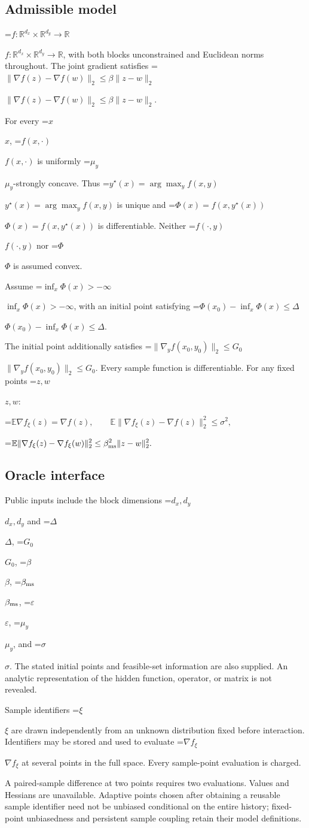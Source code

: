 \documentclass[10pt,a4paper]{article}
\newcommand{\AtlasMath}[1]{\par\begingroup\centering\setbox0=\hbox{$\displaystyle #1$}\ifdim\wd0>1.4\linewidth\typeout{ATLAS WIDE FORMULA: \the\wd0}\fi\ifdim\wd0>\linewidth\resizebox{\linewidth}{!}{\box0}\else\box0\fi\par\endgroup}
\newcommand{\AtlasInlineMath}[1]{\begingroup\setbox0=\hbox{$#1$}\ifdim\wd0>.4\linewidth\endgroup\AtlasMath{#1}\else\endgroup$#1$\fi}
\begin{document}
\subsection{Admissible model}
\AtlasInlineMath{f:\mathbb{R}^{d_x}\times\mathbb{R}^{d_y}\to\mathbb{R}}, with both blocks unconstrained and Euclidean norms throughout. The joint gradient satisfies \AtlasInlineMath{\|\nabla f(z)-\nabla f(w)\|_2\le \beta\|z-w\|_2}.

For every \AtlasInlineMath{x}, \AtlasInlineMath{f(x,\cdot)} is uniformly \AtlasInlineMath{\mu_y}-strongly concave. Thus \AtlasInlineMath{y^\star(x)=\arg\max_y f(x,y)} is unique and \AtlasInlineMath{\Phi(x)=f(x,y^\star(x))} is differentiable. Neither \AtlasInlineMath{f(\cdot,y)} nor \AtlasInlineMath{\Phi} is assumed convex.

Assume \AtlasInlineMath{\inf_x\Phi(x)>-\infty}, with an initial point satisfying \AtlasInlineMath{\Phi(x_0)-\inf_x\Phi(x)\le\Delta}.

The initial point additionally satisfies \AtlasInlineMath{\|\nabla_yf(x_0,y_0)\|_2\le G_0}. Every sample function is differentiable. For any fixed points \AtlasInlineMath{z,w}:


\AtlasMath{\mathbb{E}\nabla f_\xi(z)=\nabla f(z),\qquad\mathbb{E}\|\nabla f_\xi(z)-\nabla f(z)\|_2^2\le\sigma^2,}



\AtlasMath{\mathbb{E}\|\nabla f_\xi(z)-\nabla f_\xi(w)\|_2^2\le\beta_{\rm ms}^2\|z-w\|_2^2.}


\subsection{Oracle interface}
Public inputs include the block dimensions \AtlasInlineMath{d_x,d_y} and \AtlasInlineMath{\Delta}, \AtlasInlineMath{G_0}, \AtlasInlineMath{\beta}, \AtlasInlineMath{\beta_{\rm ms}}, \AtlasInlineMath{\varepsilon}, \AtlasInlineMath{\mu_y}, and \AtlasInlineMath{\sigma}. The stated initial points and feasible-set information are also supplied. An analytic representation of the hidden function, operator, or matrix is not revealed.

Sample identifiers \AtlasInlineMath{\xi} are drawn independently from an unknown distribution fixed before interaction. Identifiers may be stored and used to evaluate \AtlasInlineMath{\nabla f_\xi} at several points in the full space. Every sample-point evaluation is charged.

A paired-sample difference at two points requires two evaluations. Values and Hessians are unavailable. Adaptive points chosen after obtaining a reusable sample identifier need not be unbiased conditional on the entire history; fixed-point unbiasedness and persistent sample coupling retain their model definitions.
\end{document}
